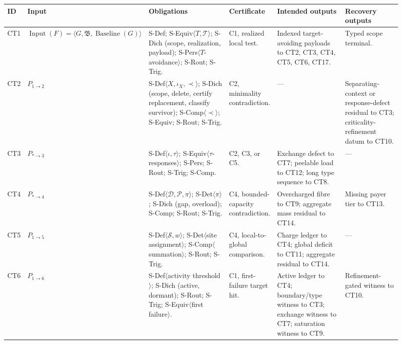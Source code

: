 \documentclass[
  11pt,
]{article}
\theoremstyle{definition}
\begin{document}
\begingroup
\tiny
\setlength{\tabcolsep}{0.8pt}
\begin{longtable}[]{@{}
  >{\raggedright\arraybackslash}p{0.055\linewidth}
  >{\raggedright\arraybackslash}p{0.23\linewidth}
  >{\raggedright\arraybackslash}p{0.22\linewidth}
  >{\raggedright\arraybackslash}p{0.10\linewidth}
  >{\raggedright\arraybackslash}p{0.18\linewidth}
  >{\raggedright\arraybackslash}p{0.15\linewidth}@{}}
\toprule\noalign{}
ID & Input & Obligations & Certificate & Intended outputs & Recovery outputs \\
\midrule\noalign{}
\endhead
\bottomrule\noalign{}
\endlastfoot
CT1 & \(\operatorname{Input}(F)=\langle G,\mathfrak B,\operatorname{Baseline}(G)\rangle\) & S-Def; S-Equiv\(\langle T,\mathcal T\rangle\); S-Dich (scope, realization, payload); S-Pers\(\langle T\)-avoidance\(\rangle\); S-Rout; S-Trig. & C1, realized local test. & Indexed target-avoiding payloads to CT2, CT3, CT4, CT5, CT6, CT17. & Typed scope terminal. \\
CT2 & \(P_{1\to2}\) & S-Def\(\langle X,\iota_X,\prec\rangle\); S-Dich (scope, delete, certify replacement, classify survivor); S-Comp\(\langle\prec\rangle\); S-Equiv; S-Rout; S-Trig. & C2, minimality contradiction. & --- & Separating-context or response-defect residual to CT3; criticality-refinement datum to CT10. \\
CT3 & \(P_{\ast\to3}\) & S-Def\(\langle\iota,\tau\rangle\); S-Equiv\(\langle\tau\)-responses\(\rangle\); S-Pers; S-Rout; S-Trig; S-Comp. & C2, C3, or C5. & Exchange defect to CT7; peelable load to CT12; long type sequence to CT8. & --- \\
CT4 & \(P_{\ast\to4}\) & S-Def\(\langle\mathcal D,\mathcal P,\pi\rangle\); S-Det\(\langle\pi\rangle\); S-Dich (gap, overload); S-Comp; S-Rout; S-Trig. & C4, bounded-capacity contradiction. & Overcharged fibre to CT9; aggregate mass residual to CT14. & Missing payer tier to CT13. \\
CT5 & \(P_{1\to5}\) & S-Def\(\langle\mathcal S,w\rangle\); S-Det\(\langle\)site assignment\(\rangle\); S-Comp\(\langle\)summation\(\rangle\); S-Rout; S-Trig. & C4, local-to-global comparison. & Charge ledger to CT4; global deficit to CT11; aggregate residual to CT14. & --- \\
CT6 & \(P_{1\to6}\) & S-Def\(\langle\)activity threshold\(\rangle\); S-Dich (active, dormant); S-Rout; S-Trig; S-Equiv\(\langle\)first failure\(\rangle\). & C1, first-failure target hit. & Active ledger to CT4; boundary/type witness to CT3; exchange witness to CT7; saturation witness to CT9. & Refinement-gated witness to CT10. \\

\end{longtable}
\end{document}
